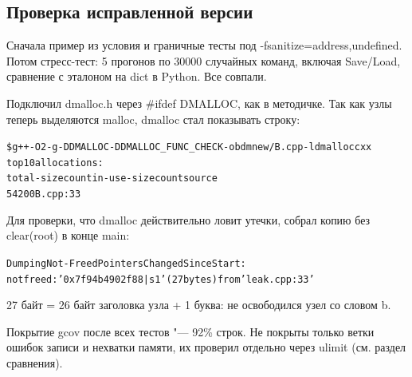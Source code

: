 \subsection{Проверка исправленной версии}
Сначала пример из условия и граничные тесты под {\ttfamily -fsanitize=address,undefined}. Потом
стресс-тест: 5 прогонов по 30000 случайных команд, включая {\ttfamily Save}/{\ttfamily Load},
сравнение с эталоном на {\ttfamily dict} в Python. Все совпали.

Подключил {\ttfamily dmalloc.h} через {\ttfamily \#ifdef DMALLOC}, как в методичке. Так как узлы
теперь выделяются {\ttfamily malloc}, dmalloc стал показывать строку:
\begin{alltt}
\$ g++ -O2 -g -DDMALLOC -DDMALLOC_FUNC_CHECK -o bdm new/B.cpp -ldmalloccxx
top 10 allocations:
 total-size  count in-use-size  count  source
         54      2           0      0  B.cpp:33
\end{alltt}
Для проверки, что dmalloc действительно ловит утечки, собрал копию без {\ttfamily clear(root)} в
конце {\ttfamily main}:
\begin{alltt}
Dumping Not-Freed Pointers Changed Since Start:
 not freed: '0x7f94b4902f88|s1' (27 bytes) from 'leak.cpp:33'
\end{alltt}
27 байт = 26 байт заголовка узла + 1 буква: не освободился узел со словом {\ttfamily b}.

Покрытие {\ttfamily gcov} после всех тестов "--- 92\% строк. Не покрыты только ветки ошибок записи и
нехватки памяти, их проверил отдельно через {\ttfamily ulimit} (см. раздел сравнения).
\pagebreak
